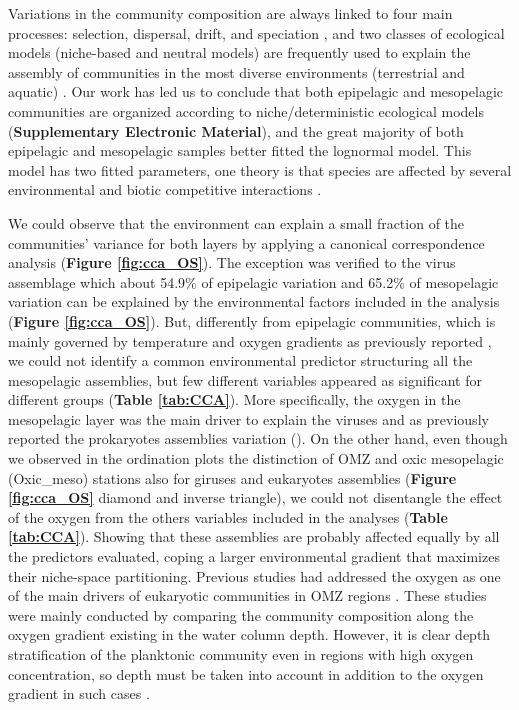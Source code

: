 \documentclass[fleqn,10pt]{wlscirep}
\begin{document}
Variations in the community composition are always linked to four main processes: selection, dispersal, drift, and speciation \cite{vellend_conceptual_2010}, and two classes of ecological models (niche-based and neutral models) are frequently used to explain the assembly of communities in the most diverse environments (terrestrial and aquatic) \cite{chave_neutral_2004, mcgill_empirical_2006}. Our work has led us to conclude that both epipelagic and mesopelagic communities are organized according to niche/deterministic ecological models (\textbf{Supplementary Electronic Material}), and the great majority of both epipelagic and mesopelagic samples better fitted the lognormal model. This model has two fitted parameters, one theory is that species are affected by several environmental and biotic competitive interactions \cite{wilson_methods_1991}. 

We could observe that the environment can explain a small fraction of the communities’ variance for both layers by applying a canonical correspondence analysis (\textbf{Figure \ref{fig:cca_OS}}). The exception was verified to the virus assemblage which about 54.9\% of epipelagic variation and 65.2\% of mesopelagic variation can be explained by the environmental factors included in the analysis (\textbf{Figure \ref{fig:cca_OS}}). But, differently from epipelagic communities, which is mainly governed by temperature and oxygen gradients as previously reported \cite{sunagawa_structure_2015,gregory_marine_2019,ibarbalz_global_2019,giner_marked_2020, ghiglione_pole--pole_2012}, we could not identify a common environmental predictor structuring all the mesopelagic assemblies, but few different variables appeared as significant for different groups (\textbf{Table \ref{tab:CCA}}). More specifically, the oxygen in the mesopelagic layer was the main driver to explain the viruses and as previously reported the prokaryotes assemblies variation (\cite{wright_microbial_2012, ulloa_pelagic_2013, aldunate_oxygen_2018}). On the other hand, even though we observed in the ordination plots the distinction of OMZ and oxic mesopelagic (Oxic\_meso) stations also for giruses and eukaryotes assemblies (\textbf{Figure \ref{fig:cca_OS}} diamond and inverse triangle), we could not disentangle the effect of the oxygen from the others variables included in the analyses (\textbf{Table \ref{tab:CCA}}). Showing that these assemblies are probably affected equally by all the predictors evaluated, coping a larger environmental gradient that maximizes their niche-space partitioning. Previous studies had addressed the oxygen as one of the main drivers of eukaryotic communities in OMZ regions \cite{de_la_iglesia_distinct_2020, orsi_effect_2012, parris_microbial_2014}. These studies were mainly conducted by comparing the community composition along the oxygen gradient existing in the water column depth. However, it is clear depth stratification of the planktonic community even in regions with high oxygen concentration, so depth must be taken into account in addition to the oxygen gradient in such cases \cite{schnetzer_depth_2011}.
\end{document}

